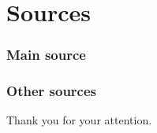 \section*{Sources}

\nocite{*}

\begin{frame}
	\frametitle{Main source}
%	
%	
	\printbibliography[title={Main source},keyword={main}]
\end{frame}

\begin{frame}[allowframebreaks]
	\frametitle{Other sources}
	\printbibliography[keyword={secondary}, title={Other sources}]
\end{frame}

\begin{frame}[plain]
	\begin{center}
		\Large{{Thank you for your attention.}}
	\end{center}
\end{frame}



